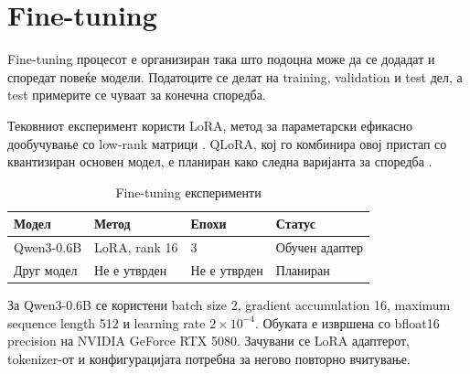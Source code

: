 \chapter{Fine-tuning}

Fine-tuning процесот е организиран така што подоцна може да се додадат и споредат повеќе модели.
Податоците се делат на training, validation и test дел, а test примерите се чуваат за конечна споредба.

Тековниот експеримент користи LoRA, метод за параметарски ефикасно дообучување со low-rank матрици \cite{hu2021lora}.
QLoRA, кој го комбинира овој пристап со квантизиран основен модел, е планиран како следна варијанта за споредба \cite{dettmers2023qlora}.

\begin{table}[ht]
  \centering
  \small
  \begin{tabular}{llll}
    \toprule
    Модел & Метод & Епохи & Статус \\
    \midrule
    Qwen3-0.6B & LoRA, rank 16 & 3 & Обучен адаптер \\
    Друг модел & Не е утврден & Не е утврден & Планиран \\
    \bottomrule
  \end{tabular}
  \caption{Fine-tuning експерименти}
\end{table}

За Qwen3-0.6B се користени batch size 2, gradient accumulation 16, maximum sequence length 512 и learning rate $2\times10^{-4}$.
Обуката е извршена со bfloat16 precision на NVIDIA GeForce RTX 5080.
Зачувани се LoRA адаптерот, tokenizer-от и конфигурацијата потребна за негово повторно вчитување.
